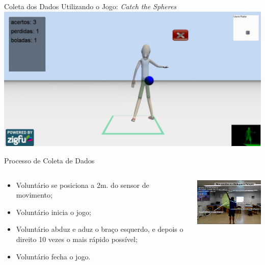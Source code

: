\documentclass{beamer}
\begin{document}
\begin{frame}{Coleta dos Dados Utilizando o Jogo: \textit{Catch the Spheres}}
      \center \includegraphics[height=2.2 in]{img/catch-the-spheres.png}
\end{frame}

\begin{frame}{Processo de Coleta de Dados}
   \begin{block}{}   
   \begin{columns}[c]
     \begin{column}{0.5\linewidth}
				\begin{itemize}[<+->]
					\item Voluntário se posiciona a 2m. do sensor de movimento;
					\item Voluntário inicia o jogo;
					\item Voluntário abduz e aduz o braço esquerdo, e depois o direito 10 vezes o mais rápido possível;
					\item Voluntário fecha o jogo.
				\end{itemize}
     \end{column}

     \begin{column}{0.55\linewidth}
				\includegraphics[width=5.5cm]{img/capturaducaokinnect.png}
    \end{column}
\end{columns}
\end{block}
\end{frame}
\end{document}
